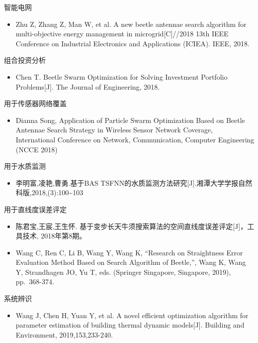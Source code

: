 \documentclass[]{ctexbook}
\providecommand{\tightlist}{%
  \setlength{\itemsep}{0pt}\setlength{\parskip}{0pt}}
\begin{document}
智能电网

\begin{itemize}
\tightlist
\item
  Zhu Z, Zhang Z, Man W, et al. A new beetle antennae search algorithm
  for multi-objective energy management in microgrid{[}C{]}//2018 13th
  IEEE Conference on Industrial Electronics and Applications (ICIEA).
  IEEE, 2018.
\end{itemize}

组合投资分析

\begin{itemize}
\tightlist
\item
  Chen T. Beetle Swarm Optimization for Solving Investment Portfolio
  Problems{[}J{]}. The Journal of Engineering, 2018.
\end{itemize}

用于传感器网络覆盖

\begin{itemize}
\tightlist
\item
  Dianna Song, Application of Particle Swarm Optimization Based on
  Beetle Antennae Search Strategy in Wireless Sensor Network Coverage,
  International Conference on Network, Communication, Computer
  Engineering (NCCE 2018)
\end{itemize}

用于水质监测

\begin{itemize}
\tightlist
\item
  李明富,凌艳,曹勇.基于BAS
  TSFNN的水质监测方法研究{[}J{]}.湘潭大学学报自然科版,2018,(3):100\textasciitilde{}103
\end{itemize}

用于直线度误差评定

\begin{itemize}
\tightlist
\item
  陈君宝,王宸,王生怀.
  基于变步长天牛须搜索算法的空间直线度误差评定{[}J{]}，工具技术,
  2018年第8期。
\item
  Wang C, Ren C, Li B, Wang Y, Wang K, ``Research on Straightness Error
  Evaluation Method Based on Search Algorithm of Beetle,'', Wang K, Wang
  Y, Strandhagen JO, Yu T, eds. (Springer Singapore, Singapore, 2019),
  pp.~368-374.
\end{itemize}

系统辨识

\begin{itemize}
\tightlist
\item
  Wang J, Chen H, Yuan Y, et al. A novel efficient optimization
  algorithm for parameter estimation of building thermal dynamic
  models{[}J{]}. Building and Environment, 2019,153,233-240.
\end{itemize}
\end{document}
